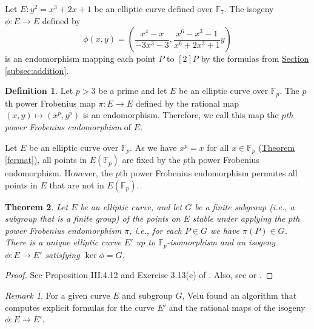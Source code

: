\documentclass[openany, a4paper, 10pt]{book}
\theoremstyle{plain}
\newtheorem{theorem}{Theorem}[chapter]
\theoremstyle{plain}
\theoremstyle{plain}
\theoremstyle{definition}
\newtheorem{definition}[theorem]{Definition}
\theoremstyle{plain}
\theoremstyle{definition}
\theoremstyle{remark}
\newtheorem*{remark}{Remark}
\newcommand{\theoref}[1]{\hyperref[#1]{Theorem \ref{#1}}}
\newcommand{\secref}[1]{\hyperref[#1]{Section \ref{#1}}}
\begin{document}
\begin{examplebox}
    Let $E: y^2 = x^3 + 2x + 1$ be an elliptic curve
    defined over $\mathbb F_7$.
    The isogeny $\phi: E \to E$ defined by
    $$\phi(x, y) = \left(\frac{x^4-x}{-3x^3-3}, \frac{x^6 - x^3 - 1}{x^6 + 2x^3 + 1} y\right)$$
    is an endomorphism mapping each point $P$ to $[2]P$ by the formulas from \secref{subsec:addition}.
\end{examplebox}


\begin{definition}
    Let $p>3$ be a prime and let $E$ be an elliptic curve over $\mathbb F_p$.
    The $p$th power Frobenius map $\pi: E \to E$ defined by the rational map
    $(x, y) \mapsto (x^p, y^p)$
    is an endomorphism.
    Therefore, we call this map the \textit{$p$th power Frobenius endomorphism} of $E$.
\end{definition}

Let $E$ be an elliptic curve over $\mathbb F_p$.
As we have $x^p = x$ for all $x \in \mathbb F_p$ (\theoref{fermat}), all points in $E(\mathbb F_p)$ are fixed by the $p$th power Frobenius endomorphism.
However, the $p$th power Frobenius endomorphism permutes all points in $E$ that are not in $E(\mathbb F_p)$.


\begin{theorem}\label{all_kernels}
    Let $E$ be an elliptic curve, and let $G$ be a finite subgroup (i.e., a subgroup that is a finite group) of the points on $E$ stable under applying the $p$th power Frobenius endomorphism $\pi$, i.e., for each $P \in G$ we have $\pi(P) \in G$.
    There is a unique elliptic curve $E'$ up to $\mathbb F_p$-isomorphism and an isogeny $\phi: E \to E'$ satisfying $\ker \phi = G$.
\end{theorem}
\begin{proof}
    See Proposition III.4.12 and Exercise 3.13(e) of \cite{arithmetic}.
    Also, see \cite[Theorem~9.6.19]{galbraith_crypto} or \cite[Lemma~6]{CSIDH}.
\end{proof}

\begin{remark}
    For a given curve $E$ and subgroup $G$, Velu \cite{velu} found an algorithm that computes explicit formulas for the curve $E'$ and the rational maps of the isogeny $\phi: E \to E'$.
\end{remark}
\end{document}
